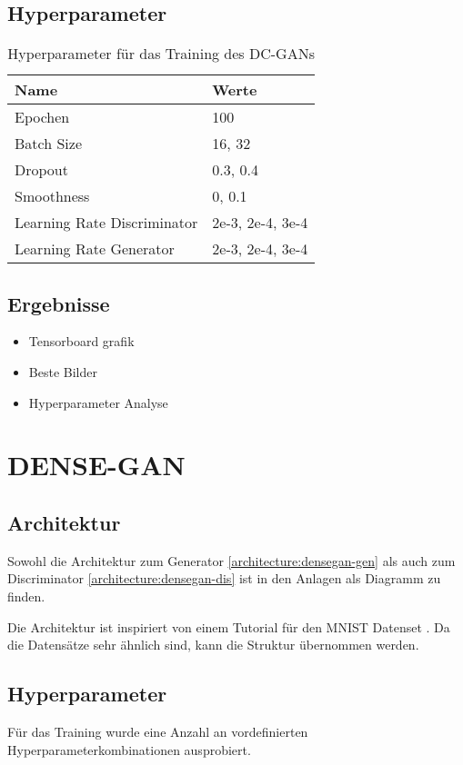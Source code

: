 \subsection{Hyperparameter}
\begin{table}[H]
	\centering
	\begin{tabular}{l l}
		Name                        & Werte            \\ \hline
		Epochen                     & 100              \\
		Batch Size                  & 16, 32           \\
		Dropout                     & 0.3, 0.4         \\
		Smoothness                  & 0, 0.1           \\
		Learning Rate Discriminator & 2e-3, 2e-4, 3e-4 \\
		Learning Rate Generator     & 2e-3, 2e-4, 3e-4
	\end{tabular}
	\caption{Hyperparameter für das Training des DC-GANs}
\end{table}

\subsection{Ergebnisse}
\begin{itemize}
	\item Tensorboard grafik
	\item Beste Bilder
	\item Hyperparameter Analyse
\end{itemize}

\section{DENSE-GAN}
\subsection{Architektur}
Sowohl die Architektur zum Generator \cref{architecture:densegan-gen} als auch zum Discriminator \cref{architecture:densegan-dis} ist in den Anlagen als Diagramm zu finden.


Die Architektur ist inspiriert von einem Tutorial für den MNIST Datenset \cite{inspiration-dense-gan}.
Da die Datensätze sehr ähnlich sind, kann die Struktur übernommen werden.


\subsection{Hyperparameter}
Für das Training wurde eine Anzahl an vordefinierten Hyperparameterkombinationen ausprobiert.

